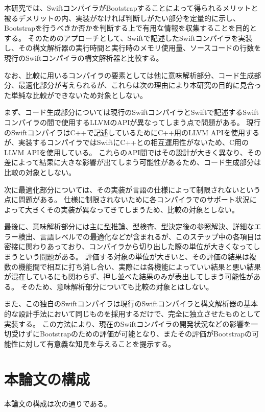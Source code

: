 本研究では、SwiftコンパイラがBootstrapすることによって得られるメリットと被るデメリットの内、実装がなければ判断しがたい部分を定量的に示し、Bootstrapを行うべきか否かを判断する上で有用な情報を収集することを目的とする。
そのためのアプローチとして、Swiftで記述したSwiftコンパイラを実装し、その構文解析器の実行時間と実行時のメモリ使用量、ソースコードの行数を現行のSwiftコンパイラの構文解析器と比較する。

なお、比較に用いるコンパイラの要素としては他に意味解析部分、コード生成部分、最適化部分が考えられるが、これらは次の理由により本研究の目的に見合った単純な比較ができないため対象としない。

まず、コード生成部分については現行のSwiftコンパイラとSwiftで記述するSwiftコンパイラの間で使用するLLVMのAPIが異なってしまう点で問題がある。
現行のSwiftコンパイラはC++で記述しているためにC++用のLLVM APIを使用するが、実装するコンパイラではSwiftにC++との相互運用性がないため、C用のLLVM APIを使用している。
これらのAPI間ではその設計が大きく異なり、その差によって結果に大きな影響が出てしまう可能性があるため、コード生成部分は比較の対象としない。

次に最適化部分については、その実装が言語の仕様によって制限されないという点に問題がある。
仕様に制限されないために各コンパイラでのサポート状況によって大きくその実装が異なってきてしまうため、比較の対象としない。

最後に、意味解析部分には主に型推論、型検査、型決定後の参照解決、詳細なエラー検出、言語レベルでの最適化などが含まれるが、このステップ中の各項目は密接に関わりあっており、コンパイラから切り出した際の単位が大きくなってしまうという問題がある。
評価する対象の単位が大きいと、その評価の結果は複数の機能間で相互に打ち消し合い、実際には各機能によっていい結果と悪い結果が混在しているにも関わらず、押し並べた結果のみが表出してしまう可能性がある。
そのため、意味解析部分についても比較の対象とはしない。

また、この独自のSwiftコンパイラは現行のSwiftコンパイラと構文解析器の基本的な設計手法において同じものを採用するだけで、完全に独立させたものとして実装する。
この方法により、現在のSwiftコンパイラの開発状況などの影響を一切受けずにBootstrapのための評価が可能となり、またその評価がBootstrapの可能性に対して有意義な知見を与えることを提示する。


\section{本論文の構成}

本論文の構成は次の通りである。

